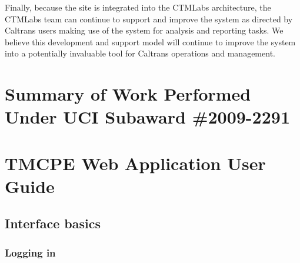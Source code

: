 \documentclass[12pt]{report}
\newif\ifuserguide %
\renewcommand{\fixme}[3][]{#1\xspace}
\newcounter{space}
\begin{document}
Finally, because the site is integrated into the \ac{CTMLabs} architecture, the
\ac{CTMLabs} team can continue to support and improve the system as directed by
Caltrans users making use of the system for analysis and reporting tasks.  We
believe this development and support model will continue to improve the system
into a potentially invaluable tool for Caltrans operations and management.







\clearpage

\appendix


\chapter{Summary of Work Performed Under UCI Subaward \#2009-2291}
\label{chap:actlog-sub}

\clearpage



\clearpage


\ifuserguide%

\chapter{TMCPE Web Application User Guide}
\label{chap:user-guide}

\fixme{crindt}{Link to the use cases (section~\ref{sec:use-cases}.)}

\section{Interface basics}
\label{sec:ui-basics}

\subsection{Logging in}
\label{sec:ui-login}
\end{document}

